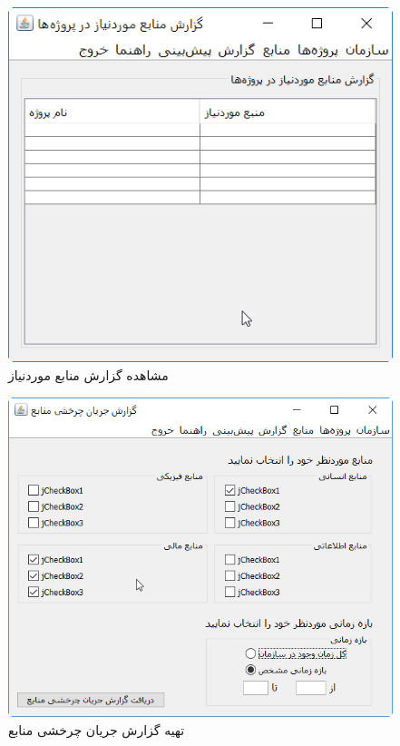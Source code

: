 \begin{figure}[H]
	\centering
	\includegraphics[scale=0.8]{img/prot/ViewNeededProjectReport}
	\caption{مشاهده گزارش منابع موردنیاز}
\end{figure}
\begin{figure}[H]
	\centering
	\includegraphics[scale=0.8]{img/prot/FlowResourceReport}
	\caption{تهیه گزارش جریان چرخشی منابع }
\end{figure}

